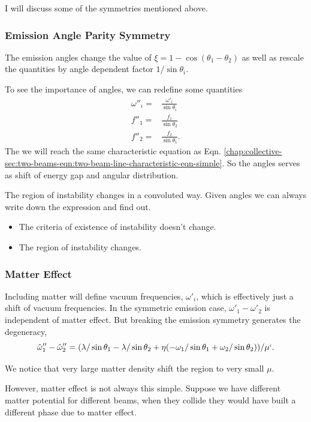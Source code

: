 I will discuss some of the symmetries mentioned above.



\subsubsection{Emission Angle Parity Symmetry}

The emission angles change the value of $\xi=1-\cos(\theta_1-\theta_2)$ as well as rescale the quantities by angle dependent factor $1/\sin\theta_i$.

To see the importance of angles, we can redefine some quantities
\begin{align*}
   \omega''_i=& \frac{\omega'_i}{\sin\theta_i}\\
   f''_1=&\frac{f_1}{\sin\theta_2} \\
   f''_2=&\frac{f_2}{\sin\theta_1}.
\end{align*}
The we will reach the same characteristic equation as Eqn. \ref{chap:collective-sec:two-beams-eqn:two-beam-line-characteristic-eqn-simple}. So the angles serves as shift of energy gap and angular distribution.

The region of instability changes in a convoluted way. Given angles we can always write down the expression and find out.
\begin{itemize}
    \item  The criteria of existence of instability doesn't change.
\item  The region of instability changes.
\end{itemize}


\subsubsection{Matter Effect}


Including matter will define vacuum frequencies, $\omega'_i$, which is effectively just a shift of vacuum frequencies. In the symmetric emission case, $\omega'_1-\omega'_2$ is independent of matter effect. But breaking the emission symmetry generates the degeneracy,
\begin{equation}
   \hat\omega''_1-\hat\omega''_2=( \lambda/\sin\theta_1 - \lambda/\sin\theta_2 + \eta(- \omega_1/\sin\theta_1 + \omega_2/\sin\theta_2) )/\mu`.
\end{equation}

We notice that very large matter density shift the region to very small $\mu$.

However, matter effect is not always this simple. Suppose we have different matter potential for different beams, when they collide they would have built a different phase due to matter effect.

